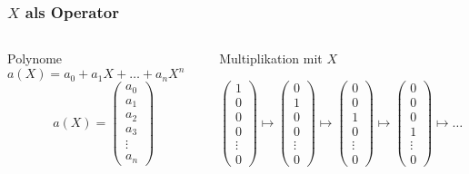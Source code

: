 %
%
%
\begin{frame}[t]
\frametitle{$X$ als Operator}
\begin{columns}[t,onlytextwidth]
\begin{column}{0.38\textwidth}
\begin{block}{Polynome}
$a(X)=a_0+a_1X+\dots+a_nX^n$
\[
a(X)
=
\begin{pmatrix}
a_0\\a_1\\a_2\\a_3\\\vdots\\a_n
\end{pmatrix}
\]
\end{block}
\end{column}
\begin{column}{0.58\textwidth}
\begin{block}{Multiplikation mit $X$}
\strut
\[
\begin{pmatrix}
1\\0\\0\\0\\\vdots\\0
\end{pmatrix}
\mapsto
\begin{pmatrix}
0\\1\\0\\0\\\vdots\\0
\end{pmatrix}
\mapsto
\begin{pmatrix}
0\\0\\1\\0\\\vdots\\0
\end{pmatrix}
\mapsto
\begin{pmatrix}
0\\0\\0\\1\\\vdots\\0
\end{pmatrix}
\mapsto\dots\mapsto
\begin{pmatrix}
0\\0\\0\\0\\\vdots\\1
\end{pmatrix}
\]
\end{block}
\end{column}
\end{columns}
\end{frame}
